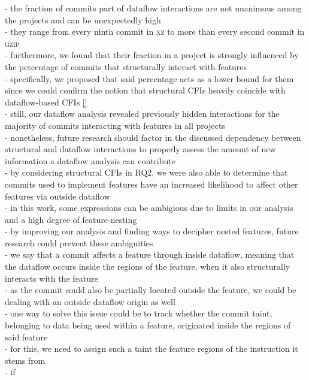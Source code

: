 - the fraction of commits part of dataflow interactions are not unanimous among the projects and can be unexpectedly high \\
- they range from every ninth commit in \textsc{xz} to more than every second commit in \textsc{gzip} \\
- furthermore, we found that their fraction in a project is strongly influenced by the percentage of commits that structurally interact with features \\
- specifically, we proposed that said percentage acts as a lower bound for them since we could confirm the notion that structural CFIs heavily coincide with dataflow-based CFIs \ref{} \\
- still, our dataflow analysis revealed previously hidden interactions for the majority of commits interacting with features in all projects \\
- nonetheless, future research should factor in the discussed dependency between structural and dataflow interactions to properly assess the amount of new information a dataflow analysis can contribute \\
- by considering structural CFIs in RQ2, we were also able to determine that commits used to implement features have an increased likelihood to affect other features via outside dataflow \\













\iffalse 
- in this work, some expressions can be ambigious due to limits in our analysis and a high degree of feature-nesting \\
- by improving our analysis and finding ways to decipher nested features, future research could prevent these ambiguities \\
- we say that a commit affects a feature through inside dataflow, meaning that the dataflow occurs inside the regions of the feature, when it also structurally interacts with the feature \\
- as the commit could also be partially located outside the feature, we could be dealing with an outside dataflow origin as well \\
- one way to solve this issue could be to track whether the commit taint, belonging to data being used within a feature, originated inside the regions of said feature \\
- for this, we need to assign such a taint the feature regions of the instruction it stems from \\
- if 

